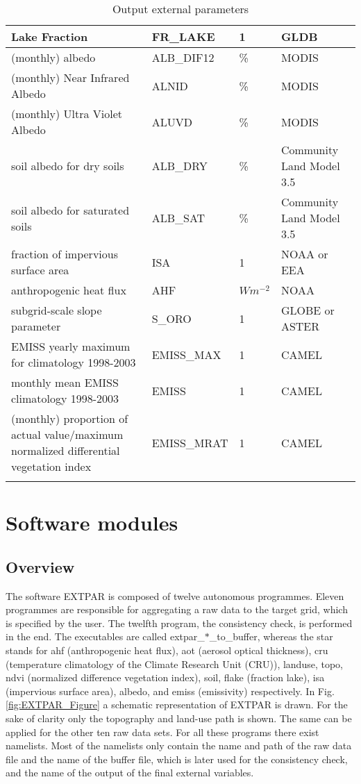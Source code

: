 \documentclass[a4paper,10pt,DIV14,BCOR1cm,titlepage,twoside]{scrartcl}
\providecommand{\tabularnewline}{\\}
\begin{document}
\begin{longtable}{|p{6.5cm}|p{3cm}|p{1.6cm}|p{3.5cm}|}
Lake Fraction  &FR\_\-LAKE  &1  & GLDB 
\tabularnewline \hline
(monthly) albedo & ALB\_DIF12 &\% & MODIS
\tabularnewline \hline
(monthly) Near Infrared Albedo & ALNID &\% & MODIS
\tabularnewline \hline
(monthly) Ultra Violet Albedo & ALUVD &\% & MODIS
\tabularnewline\hline
soil albedo for dry soils &ALB\_\-DRY &\% & Community Land Model 3.5
\tabularnewline\hline
soil albedo for saturated soils &ALB\_\-SAT &\% & Community Land Model 3.5
\tabularnewline\hline
fraction of impervious surface area &ISA &1 & NOAA or EEA
\tabularnewline\hline
anthropogenic heat flux &AHF &$W m^{-2}$ & NOAA
\tabularnewline\hline
subgrid-scale slope parameter &S\_ORO &1 & GLOBE or ASTER
\tabularnewline\hline
EMISS yearly maximum for climatology 1998-2003 &EMISS\_MAX &1 & CAMEL
\tabularnewline\hline
monthly mean EMISS climatology 1998-2003 &EMISS &1 & CAMEL
\tabularnewline\hline
(monthly) proportion of actual value/maximum normalized differential vegetation index &EMISS\_MRAT &1 & CAMEL
\tabularnewline\hline
\bottomrule
\caption{Output external parameters}
\label{extpar_output}
\end{longtable}


\section{Software modules}\label{Software_modules}
\subsection{Overview}\label{Overview}
The software EXTPAR is composed of twelve autonomous programmes. Eleven programmes are responsible for aggregating a raw data to the target grid, which is specified by the user. The twelfth program, the consistency check, is performed in the end. The executables are called extpar\_$\ast$\_to\_buffer, whereas the star stands for ahf (anthropogenic heat flux), aot (aerosol optical thickness), cru (temperature climatology of the Climate Research Unit (CRU)), landuse, topo, ndvi (normalized difference vegetation index), soil, flake (fraction lake), isa (impervious surface area), albedo, and emiss (emissivity) respectively. In Fig. \ref{fig:EXTPAR_Figure} a schematic representation of EXTPAR is drawn. For the sake of clarity only the topography and land-use path is shown. The same can be applied for the other ten raw data sets. For all these programs there exist namelists. Most of the namelists only contain the name and path of the raw data file and the name of the buffer file, which is later used for the consistency check, and the name of the output of the final external variables. \par\medskip\noindent
\end{document}

